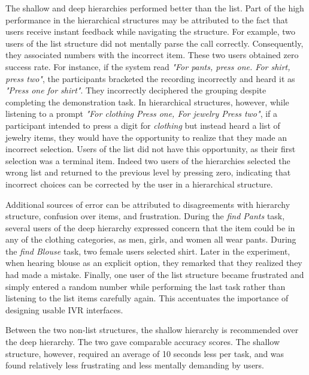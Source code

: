 \documentclass{sigchi}
\begin{document}
The shallow and deep hierarchies performed better than the list. Part of the high performance in the hierarchical structures may be attributed to the fact that users receive instant feedback while navigating the structure. For example, two users of the list structure did not mentally parse the call correctly. Consequently, they associated numbers with the incorrect item. These two users obtained zero success rate. For instance, if the system read \textit{"For pants, press one. For shirt, press two"}, the participants bracketed the recording incorrectly and heard it as \textit{"Press one for shirt"}. They incorrectly deciphered the grouping despite completing the demonstration task. In hierarchical structures, however, while listening to a prompt \textit{"For clothing Press one, For jewelry Press two"}, if a participant intended to press a digit for \textit{clothing} but instead heard a list of jewelry items, they would have the opportunity to realize that they made an incorrect selection. Users of the list did not have this opportunity, as their first selection was a terminal item. Indeed two users of the hierarchies selected the wrong list and returned to the previous level by pressing zero, indicating that incorrect choices can be corrected by the user in a hierarchical structure.

Additional sources of error can be attributed to disagreements with hierarchy structure, confusion over items, and frustration. During the \textit{find Pants} task, several users of the deep hierarchy expressed concern that the item could be in any of the clothing categories, as men, girls, and women all wear pants. During the \textit{find Blouse} task, two female users selected shirt. Later in the experiment, when hearing blouse as an explicit option, they remarked that they realized they had made a mistake. Finally, one user of the list structure became frustrated and simply entered a random number while performing the last task rather than listening to the list items carefully again. This accentuates the importance of designing usable IVR interfaces. 

Between the two non-list structures, the shallow hierarchy is recommended over the deep hierarchy. The two gave comparable accuracy scores. The shallow structure, however, required an average of 10 seconds less per task, and was found relatively less frustrating and less mentally demanding by users.
\end{document}
